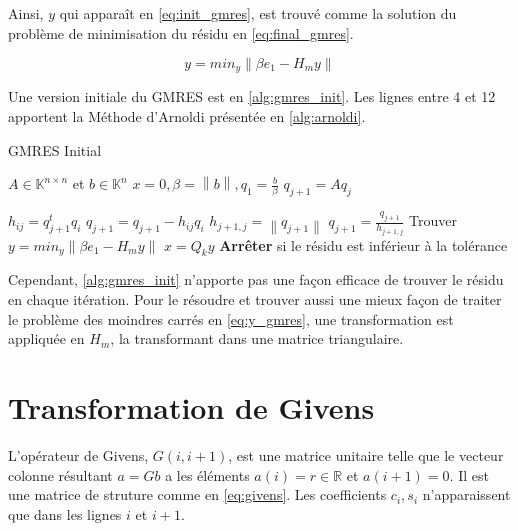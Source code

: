 \documentclass[a4paper, 15pt]{report}
\newcommand{\norm}[1]{\left\lVert#1\right\rVert}
\begin{document}
    Ainsi, $y$ qui apparaît en \ref{eq:init_gmres}, est trouvé comme la solution du problème de minimisation du résidu en \ref{eq:final_gmres}.

    \begin{equation}\label{eq:y_gmres}
        y = min_{y} \norm{\beta e_{1} - H_{m}y}
    \end{equation}

    Une version initiale du GMRES est en \ref{alg:gmres_init}. Les lignes entre 4 et 12 apportent la Méthode d'Arnoldi présentée en \ref{alg:arnoldi}.
    
    \begin{algorithm}
    \caption{GMRES Initial}\label{alg:gmres_init}
    \begin{algorithmic}[1]
    \State $A \in \mathbb{K}^{n \times n}$ et $b\in \mathbb{K}^{n}$
    \State $x=0, \beta=\norm{b},q_{1}=\frac{b}{\beta}$
    \State $q_{j+1} = Aq_{j}$

    \State $h_{ij}= q_{j+1}^{t}q_{i}$
    \State $q_{j+1} = q_{j+1} - h_{ij}q_{i}$
    \EndFor
    \State $h_{j+1,j}=\norm{q_{j+1}}$
    \State $q_{j+1} = \frac{q_{j+1}}{h_{j+1,j}}$
    \EndFor
    \State Trouver $y = min_{y} \norm{\beta e_{1} - H_{m}y}$
    \State $x = Q_{k}y$
    \State \textbf{Arrêter} si le résidu est inférieur à la tolérance
    \EndFor
    \end{algorithmic}
    \end{algorithm}

    Cependant, \ref{alg:gmres_init} n'apporte pas une façon efficace de trouver le résidu en chaque itération. Pour le résoudre et trouver aussi une mieux façon de traiter le problème des moindres carrés en \ref{eq:y_gmres}, une transformation est appliquée en $H_{m}$, la transformant dans une matrice triangulaire.

    \section{Transformation de Givens}

    L'opérateur de Givens, $G(i,i+1)$, est une matrice unitaire telle que le vecteur colonne résultant $a = Gb$ a les éléments $a(i) = r \in \mathbb{R}$ et $a(i+1)=0$. Il est une matrice de struture comme en \ref{eq:givens}. Les coefficients $c_{i},s_{i}$ n'apparaissent que dans les lignes $i$ et $i+1$.
\end{document}
